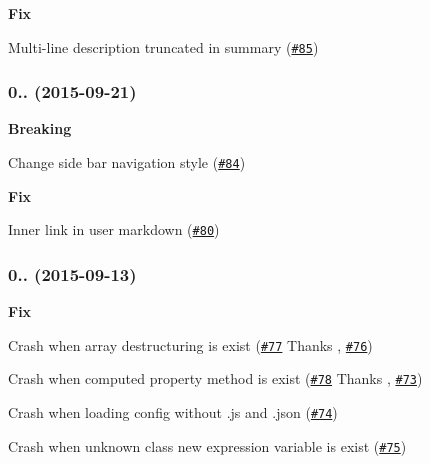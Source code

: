 \begin{DoxyItemize}
\item {\bfseries Fix}
\begin{DoxyItemize}
\item Multi-\/line description truncated in summary (\href{https://github.com/esdoc/esdoc/issues/85}{\tt \#85})
\end{DoxyItemize}
\end{DoxyItemize}

\subsubsection*{0.. (2015-\/09-\/21)}


\begin{DoxyItemize}
\item {\bfseries Breaking}
\begin{DoxyItemize}
\item Change side bar navigation style (\href{https://github.com/esdoc/esdoc/issues/84}{\tt \#84})
\end{DoxyItemize}
\item {\bfseries Fix}
\begin{DoxyItemize}
\item Inner link in user markdown (\href{https://github.com/esdoc/esdoc/issues/80}{\tt \#80})
\end{DoxyItemize}
\end{DoxyItemize}

\subsubsection*{0.. (2015-\/09-\/13)}


\begin{DoxyItemize}
\item {\bfseries Fix}
\begin{DoxyItemize}
\item Crash when array destructuring is exist (\href{https://github.com/esdoc/esdoc/pull/77}{\tt \#77} Thanks , \href{https://github.com/esdoc/esdoc/issues/76}{\tt \#76})
\item Crash when computed property method is exist (\href{https://github.com/esdoc/esdoc/pull/78}{\tt \#78} Thanks , \href{https://github.com/esdoc/esdoc/issues/73}{\tt \#73})
\item Crash when loading config without .js and .json (\href{https://github.com/esdoc/esdoc/issues/74}{\tt \#74})
\item Crash when unknown class new expression variable is exist (\href{https://github.com/esdoc/esdoc/issues/75}{\tt \#75})
\end{DoxyItemize}
\end{DoxyItemize}

